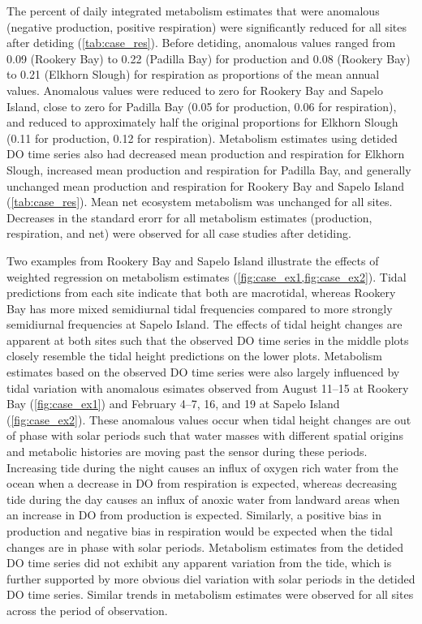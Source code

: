 \documentclass[letterpaper,12pt,oneside]{article}\usepackage[]{graphicx}\usepackage[]{color}
\begin{document}
The percent of daily integrated metabolism estimates that were anomalous (negative production, positive respiration) were significantly reduced for all sites after detiding (\cref{tab:case_res}).  Before detiding, anomalous values ranged from 0.09 (Rookery Bay) to 0.22 (Padilla Bay) for production and 0.08 (Rookery Bay) to 0.21 (Elkhorn Slough) for respiration as proportions of the mean annual values. Anomalous values were reduced to zero for Rookery Bay and Sapelo Island, close to zero for Padilla Bay (0.05 for production, 0.06 for respiration), and reduced to approximately half the original proportions for Elkhorn Slough (0.11 for production, 0.12 for respiration).  Metabolism estimates using detided \ac{DO} time series also had decreased mean production and respiration for Elkhorn Slough, increased mean production and respiration for Padilla Bay, and generally unchanged mean production and respiration for Rookery Bay and Sapelo Island (\cref{tab:case_res}).  Mean net ecosystem metabolism was unchanged for all sites.  Decreases in the standard erorr for all metabolism estimates (production, respiration, and net) were observed for all case studies after detiding.  

Two examples from Rookery Bay and Sapelo Island illustrate the effects of weighted regression on metabolism estimates (\cref{fig:case_ex1,fig:case_ex2}).  Tidal predictions from each site indicate that both are macrotidal, whereas Rookery Bay has more mixed semidiurnal tidal frequencies compared to more strongly semidiurnal frequencies at Sapelo Island. The effects of tidal height changes are apparent at both sites such that the observed \ac{DO} time series in the middle plots closely resemble the tidal height predictions on the lower plots.  Metabolism estimates based on the observed \ac{DO} time series were also largely influenced by tidal variation with anomalous esimates observed from August 11--15 at Rookery Bay (\cref{fig:case_ex1}) and February 4--7, 16, and 19 at Sapelo Island (\cref{fig:case_ex2}). These anomalous values occur when tidal height changes are out of phase with solar periods such that water masses with different spatial origins and metabolic histories are moving past the sensor during these periods.  Increasing tide during the night causes an influx of oxygen rich water from the ocean when a decrease in \ac{DO} from respiration is expected, whereas decreasing tide during the day causes an influx of anoxic water from landward areas when an increase in \ac{DO} from production is expected.  Similarly, a positive bias in production and negative bias in respiration would be expected when the tidal changes are in phase with solar periods.  Metabolism estimates from the detided \ac{DO} time series did not exhibit any apparent variation from the tide, which is further supported by more obvious diel variation with solar periods in the detided \ac{DO} time series.  Similar trends in metabolism estimates were observed for all sites across the period of observation. 
\end{document}
